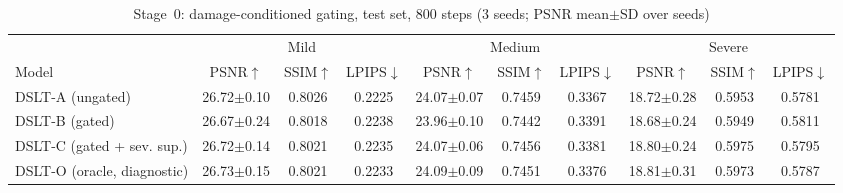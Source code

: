 \begin{table}[t]
\centering
\caption{Stage~0: damage-conditioned gating, test set, 800 steps (3 seeds; PSNR mean$\pm$SD over seeds)}
\label{tab:gating}
\setlength{\tabcolsep}{4pt}
\begin{tabular}{lccccccccc}
\toprule
 & \multicolumn{3}{c}{Mild} & \multicolumn{3}{c}{Medium} & \multicolumn{3}{c}{Severe} \\
\cmidrule(lr){2-4}\cmidrule(lr){5-7}\cmidrule(lr){8-10}
Model & PSNR$\uparrow$ & SSIM$\uparrow$ & LPIPS$\downarrow$ & PSNR$\uparrow$ & SSIM$\uparrow$ & LPIPS$\downarrow$ & PSNR$\uparrow$ & SSIM$\uparrow$ & LPIPS$\downarrow$ \\
\midrule
DSLT-A (ungated) & 26.72$\pm$0.10 & 0.8026 & 0.2225 & 24.07$\pm$0.07 & 0.7459 & 0.3367 & 18.72$\pm$0.28 & 0.5953 & 0.5781 \\
DSLT-B (gated) & 26.67$\pm$0.24 & 0.8018 & 0.2238 & 23.96$\pm$0.10 & 0.7442 & 0.3391 & 18.68$\pm$0.24 & 0.5949 & 0.5811 \\
DSLT-C (gated + sev. sup.) & 26.72$\pm$0.14 & 0.8021 & 0.2235 & 24.07$\pm$0.06 & 0.7456 & 0.3381 & 18.80$\pm$0.24 & 0.5975 & 0.5795 \\
DSLT-O (oracle, diagnostic) & 26.73$\pm$0.15 & 0.8021 & 0.2233 & 24.09$\pm$0.09 & 0.7451 & 0.3376 & 18.81$\pm$0.31 & 0.5973 & 0.5787 \\
\bottomrule
\end{tabular}
\end{table}

